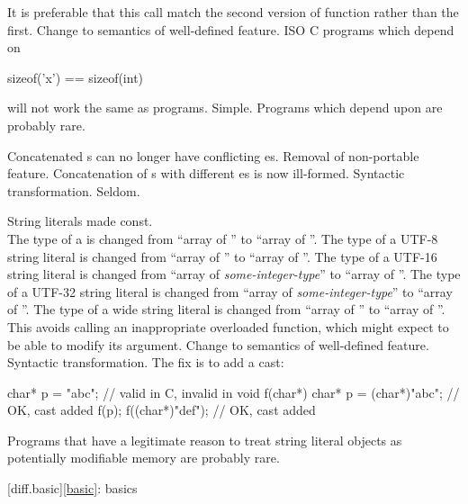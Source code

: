 It is preferable that this call match the second version of
function rather than the first.
\effect
Change to semantics of well-defined feature.
ISO C programs which depend on

\begin{codeblock}
sizeof('x') == sizeof(int)
\end{codeblock}

will not work the same as \Cpp{} programs.
\difficulty
Simple.
\howwide
Programs which depend upon  are probably rare.

\change
Concatenated s can no longer have
conflicting es.
\rationale
Removal of non-portable feature.
\effect
Concatenation of s
with different es
is now ill-formed.
\difficulty
Syntactic transformation.
\howwide
Seldom.

\change
String literals made const.\\
The type of a  is changed
from ``array of ''
to ``array of ''.
%
The type of a UTF-8 string literal is changed
from ``array of ''
to ``array of ''.
%
The type of a UTF-16 string literal is changed
from ``array of \textit{some-integer-type}''
to ``array of ''.
%
The type of a UTF-32 string literal is changed
from ``array of \textit{some-integer-type}''
to ``array of ''.
The type of a wide string literal is changed
from ``array of ''
to ``array of ''.
\rationale
This avoids calling an inappropriate overloaded function,
which might expect to be able to modify its argument.
\effect
Change to semantics of well-defined feature.
\difficulty
Syntactic transformation. The fix is to add a cast:

\begin{codeblock}
char* p = "abc";                // valid in C, invalid in \Cpp{}
void f(char*) {
  char* p = (char*)"abc";       // OK, cast added
  f(p);
  f((char*)"def");              // OK, cast added
}
\end{codeblock}

\howwide
Programs that have a legitimate reason to treat string literal objects
as potentially modifiable memory are probably rare.

[diff.basic]{\ref{basic}: basics}


